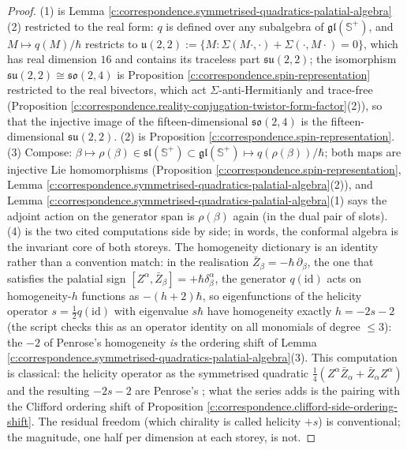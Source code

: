 \documentclass[11pt]{article}
\theoremstyle{definition}
\theoremstyle{plain}
\providecommand{\CS}{}\renewcommand{\CS}{{\mathbb{S}^{+}}}
\begin{document}
\begin{proof}
(1) is Lemma \ref{c:correspondence.symmetrised-quadratics-palatial-algebra}(2) restricted to the real form: $q$ is defined over any subalgebra of $\mathfrak{gl}(\CS)$, and $M \mapsto q(M)/\hbar$ restricts to $\mathfrak{u}(2,2) := \{M : \Sigma(M\cdot,\cdot) + \Sigma(\cdot,M\cdot) = 0\}$, which has real dimension $16$ and contains its traceless part $\mathfrak{su}(2,2)$; the isomorphism $\mathfrak{su}(2,2)\cong\mathfrak{so}(2,4)$ is Proposition \ref{c:correspondence.spin-representation} restricted to the real bivectors, which act $\Sigma$-anti-Hermitianly and trace-free (Proposition \ref{c:correspondence.reality-conjugation-twistor-form-factor}(2)), so that the injective image of the fifteen-dimensional $\mathfrak{so}(2,4)$ is the fifteen-dimensional $\mathfrak{su}(2,2)$. (2) is Proposition \ref{c:correspondence.spin-representation}. (3) Compose: $\beta \mapsto \rho(\beta) \in \mathfrak{sl}(\CS) \subset \mathfrak{gl}(\CS) \mapsto q(\rho(\beta))/\hbar$; both maps are injective Lie homomorphisms (Proposition \ref{c:correspondence.spin-representation}, Lemma \ref{c:correspondence.symmetrised-quadratics-palatial-algebra}(2)), and Lemma \ref{c:correspondence.symmetrised-quadratics-palatial-algebra}(1) says the adjoint action on the generator span is $\rho(\beta)$ again (in the dual pair of slots). (4) is the two cited computations side by side; in words, the conformal algebra is the invariant core of both storeys. The homogeneity dictionary is an identity rather than a convention match: in the realisation $\bar Z_\beta = -\hbar\,\partial_\beta$, the one that satisfies the palatial sign $[Z^\alpha, \bar Z_\beta] = +\hbar\delta^\alpha_\beta$, the generator $q(\mathrm{id})$ acts on homogeneity-$h$ functions as $-(h+2)\hbar$, so eigenfunctions of the helicity operator $s = \tfrac12 q(\mathrm{id})$ with eigenvalue $s\hbar$ have homogeneity exactly $h = -2s - 2$ (the script checks this as an operator identity on all monomials of degree $\le 3$): the $-2$ of Penrose's homogeneity \cite{Penrose1967, PenroseRindler86} \emph{is} the ordering shift of Lemma \ref{c:correspondence.symmetrised-quadratics-palatial-algebra}(3). This computation is classical: the helicity operator as the symmetrised quadratic $\tfrac14(Z^\alpha\bar Z_\alpha + \bar Z_\alpha Z^\alpha)$ and the resulting $-2s-2$ are Penrose's \cite[Vol.~2, Ch.~6]{PenroseRindler86}; what the series adds is the pairing with the Clifford ordering shift of Proposition \ref{c:correspondence.clifford-side-ordering-shift}. The residual freedom (which chirality is called helicity $+s$) is conventional; the magnitude, one half per dimension at each storey, is not.

\end{proof}
\end{document}
